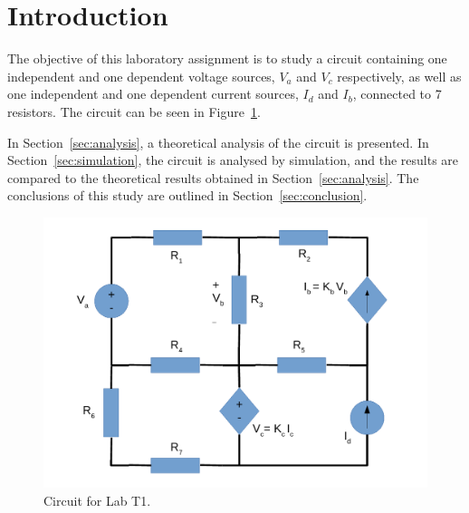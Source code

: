 \pagebreak
\section{Introduction}
\label{sec:introduction}

The objective of this laboratory assignment is to study a circuit containing one independent and one dependent voltage sources, $V_a$ and $V_c$ respectively, as well as one independent and one dependent current sources, $I_d$ and $I_b$, connected to 7 resistors. The circuit can be seen in Figure~\ref{fig:circuito_t1}.



In Section~\ref{sec:analysis}, a theoretical analysis of the circuit is
presented. In Section~\ref{sec:simulation}, the circuit is analysed by
simulation, and the results are compared to the theoretical results obtained in
Section~\ref{sec:analysis}. The conclusions of this study are outlined in
Section~\ref{sec:conclusion}.

\begin{figure}[H] \centering
\includegraphics[width=0.5\linewidth]{circuito_T1.pdf}
\caption{Circuit for Lab T1.}
\label{fig:circuito_t1}
\end{figure}

